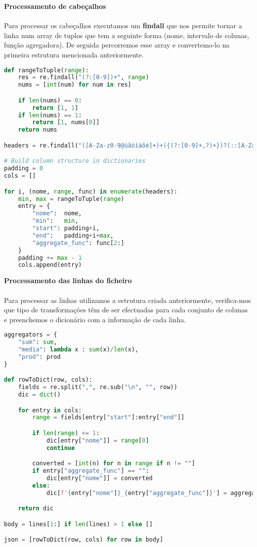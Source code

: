 \documentclass[11pt,a4paper]{report}
\begin{document}
\item\textbf{Processamento de cabeçalhos}
\paragraph{}
Para processar os cabeçalhos executamos um \textbf{findall} que nos permite tornar a linha num array de tuplos  
que tem a seguinte forma (nome, intervalo de colunas, função agregadora). De seguida percorremos esse  
array e convertemo-lo na primeira estrutura mencionada anteriormente.

\begin{lstlisting}[language=Python]
def rangeToTuple(range):
    res = re.findall("(?:[0-9])+", range)
    nums = [int(num) for num in res]

    if len(nums) == 0:
        return [1, 1]
    if len(nums) == 1:
        return [1, nums[0]]
    return nums

headers = re.findall("([A-Za-z0-9@úãóíáõé]+)+({(?:[0-9]+,?)+})?(::[A-Za-z]+)?", lines[0])

# Build column structure in dictionaries
padding = 0
cols = []

for i, (nome, range, func) in enumerate(headers):
    min, max = rangeToTuple(range)
    entry = {
        "nome":  nome,
        "min":   min,
        "start": padding+i,
        "end":   padding+i+max,
        "aggregate_func": func[2:]
    }
    padding += max - 1
    cols.append(entry)
\end{lstlisting}

\item \textbf{Processamento das linhas do ficheiro}
\paragraph{}
Para processar as linhas utilizamos a estrutura criada anteriormente, verifica-mos que tipo de transformações  
têm de ser efectuadas para cada conjunto de colunas e preenchemos o dicionário com a informação de cada linha.  \\
\begin{lstlisting}[language=Python]
aggregators = {
    "sum": sum,
    "media": lambda x : sum(x)/len(x),
    "prod": prod
}

def rowToDict(row, cols):
    fields = re.split(",", re.sub("\n", "", row))
    dic = dict()

    for entry in cols:
        range = fields[entry["start"]:entry["end"]]

        if len(range) <= 1:
            dic[entry["nome"]] = range[0]
            continue

        converted = [int(n) for n in range if n != ""]
        if entry["aggregate_func"] == "":
            dic[entry["nome"]] = converted
        else:
            dic[f'{entry["nome"]}_{entry["aggregate_func"]}'] = aggregators[entry["aggregate_func"]](converted)

    return dic

body = lines[1:] if len(lines) > 1 else []

json = [rowToDict(row, cols) for row in body]
\end{lstlisting}
\end{document}

